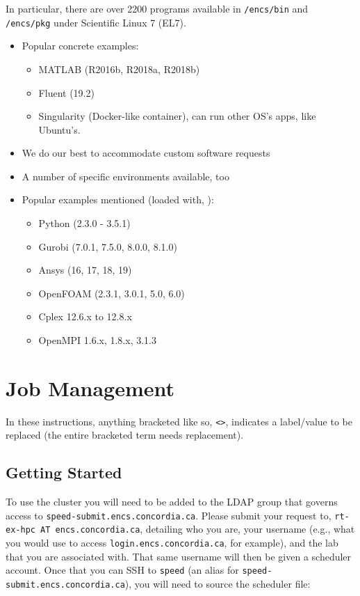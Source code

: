 \documentclass{easychair}
\begin{document}
In particular, there are over 2200 programs available in
\texttt{/encs/bin} and \texttt{/encs/pkg} under Scientific Linux 7 (EL7).

\begin{itemize}
	\item 
Popular concrete examples:
\begin{itemize}
	\item 
MATLAB (R2016b, R2018a, R2018b)
	\item 
Fluent (19.2)
	\item 
Singularity (Docker-like container), can run other OS's apps, like Ubuntu's.
\end{itemize}
	\item 
We do our best to accommodate custom software requests
	\item 
A number of specific environments available, too
	\item 
Popular examples mentioned (loaded with, ):
\begin{itemize}
	\item 
Python (2.3.0 - 3.5.1)
	\item 
Gurobi (7.0.1, 7.5.0, 8.0.0, 8.1.0)
	\item 
Ansys (16, 17, 18, 19)
	\item 
OpenFOAM (2.3.1, 3.0.1, 5.0, 6.0)
	\item 
Cplex 12.6.x to 12.8.x
	\item 
OpenMPI 1.6.x, 1.8.x, 3.1.3
\end{itemize}
\end{itemize}


\section{Job Management}
\label{sect:job-management}

In these instructions, anything bracketed like so, \verb+<>+, indicates a
label/value to be replaced (the entire bracketed term needs replacement).

\subsection{Getting Started}

To use the cluster you will need to be added to the LDAP group that governs 
access to \texttt{speed-submit.encs.concordia.ca}. Please submit your request 
to, \texttt{rt-ex-hpc AT encs.concordia.ca}, detailing who you are, your username 
(e.g., what you would use to access \texttt{login.encs.concordia.ca}, for 
example), and the lab that you are associated with. That same username will 
then be given a scheduler account. Once that you can SSH to \texttt{speed}
(an alias for \texttt{speed-submit.encs.concordia.ca}), you will
need to source the scheduler file:
\end{document}
